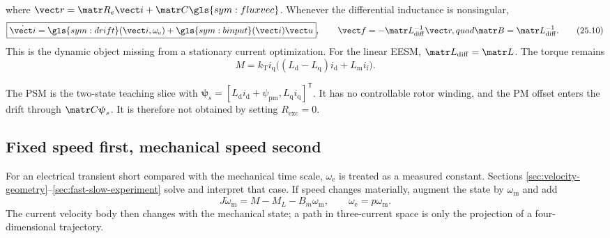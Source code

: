 where \(\vect r=\matr R_e\vect i+\matr C\gls{sym:fluxvec}\).  Whenever the
differential inductance is nonsingular,
\[
 \boxed{\dot{\vect i}=\gls{sym:drift}(\vect i,\omega_{\mathrm e})
 +\gls{sym:binput}(\vect i)\vect u},\qquad
 \vect f=-\matr L_{\mathrm{diff}}^{-1}\vect r,quad
 \matr B=\matr L_{\mathrm{diff}}^{-1}.
 \tag{25.10}
\]
This is the dynamic object missing from a stationary current optimization.
For the linear EESM, \(\matr L_{\mathrm{diff}}=\matr L\).  The torque remains
\[
 M=k_{\mathrm T}i_{\mathrm q}
 \bigl((L_{\mathrm d}-L_{\mathrm q})i_{\mathrm d}+L_{\mathrm m}i_{\mathrm f}\bigr).
 \tag{25.11}
\]



The PSM is the two-state teaching slice with
\(\boldsymbol\psi_s=[L_{\mathrm d}i_{\mathrm d}+\psi_{\mathrm{pm}},
L_{\mathrm q}i_{\mathrm q}]^{\mathsf T}\).  It has no controllable rotor
winding, and the PM offset enters the drift through \(\matr C\boldsymbol\psi_s\).
It is therefore not obtained by setting \(R_{\mathrm{exc}}=0\).

\subsection{Fixed speed first, mechanical speed second}

For an electrical transient short compared with the mechanical time scale,
\(\omega_{\mathrm e}\) is treated as a measured constant.  Sections
\ref{sec:velocity-geometry}--\ref{sec:fast-slow-experiment} solve and interpret
that case.  If speed changes materially, augment the state by
\(\omega_{\mathrm m}\) and add
\[
 J\dot\omega_{\mathrm m}=M-M_L-B_m\omega_{\mathrm m},
 \qquad \omega_{\mathrm e}=p\omega_{\mathrm m}.
 \tag{25.12}
\]
The current velocity body then changes with the mechanical state; a path in
three-current space is only the projection of a four-dimensional trajectory.


